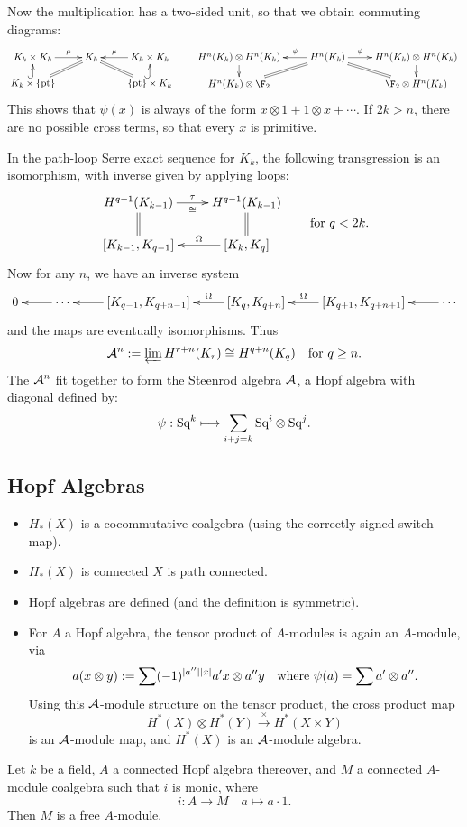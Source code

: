 \documentclass[11pt]{article}
\renewcommand{\Steen}{\calA}
\begin{document}
\noindent Now the multiplication has a two-sided unit, so that we obtain commuting diagrams:
\[\xymatrix@R=.4cm{
K_k\times K_k
\ar[r]^-{\mu}
&%
K_k
\ar@{=}[rd]
\ar@{=}[ld]
&%
K_k\times K_k
\ar[l]_-{\mu}
\\%
K_k\times\{\textup{pt}\}\ar@{^{(}->}[u]
&%
&%
\{\textup{pt}\}\times K_k\ar@{^{(}->}[u]
}\qquad 
\xymatrix@R=.4cm{
H^n(K_k)\otimes H^n(K_k)
\ar[r];[]_-{\psi}
&%
H^n(K_k)
\ar@{=}[dr];[]\ar@{=}[dl];[]
&%
H^n(K_k)\otimes H^n(K_k)
\ar[l];[]^-{\psi}
\\%
H^n(K_k)\otimes\F_2\ar[u];[]
&%
&%
\F_2\otimes H^n(K_k)\ar[u];[]
}\]
This shows that $\psi(x)$ is always of the form $x\otimes 1+1\otimes x+\cdots$. If $2k>n$, there are no possible cross terms, so that every $x$ is primitive.

In the path-loop Serre exact sequence for $K_k$, the following transgression is an isomorphism, with inverse given by applying loops:
\[\vcenter{\xymatrix@R=6mm{
{H}^{q-1}(K_{k-1})
\ar[r]_-{\cong}^-{\tau}
\ar@{=}[d]
&%
{H}^{q-1}(K_{k-1})
\ar@{=}[d]
\\%
[K_{k-1},K_{q-1}]
&%
[K_{k},K_{q}]
\ar[l]_-{\Omega}
}}\textup{\qquad for $q<2k$}.\]
Now for any $n$, we have an inverse system
\[\xymatrix{
0&
\ar[l]\cdots&
[K_{q-1},K_{q+n-1}]\ar[l]&
[K_q,K_{q+n}]\ar[l]_-\Omega&
[K_{q+1},K_{q+n+1}]\ar[l]_-\Omega&
\cdots\ar[l]}\]
and the maps are eventually isomorphisms. Thus
\[\Steen^n:=\varprojlim H^{r+n}(K_r)\cong H^{q+n}(K_q)\textup{\quad for $q\geq n$.}\]
The $\Steen^n$ fit together to form the Steenrod algebra $\Steen$, a Hopf algebra with diagonal defined by:
\[\psi:\textup{Sq}^k\longmapsto\sum_{i+j=k}\textup{Sq}^i\otimes\textup{Sq}^j.\]
\subsection{Hopf Algebras}
\begin{itemize}\squishlist
\item $H_*(X)$ is a cocommutative coalgebra (using the correctly signed switch map).
\item $H_*(X)$ is connected \Iff $X$ is path connected.
\item Hopf algebras are defined (and the definition is symmetric).
\item For $A$ a Hopf algebra, the tensor product of $A$-modules is again an $A$-module, via
\[a(x\otimes y):=\sum(-1)^{|a''||x|}a'x\otimes a''y\textup{\quad where $\psi(a)=\sum a'\otimes a''$.}\]
Using this $\Steen$-module structure on the tensor product, the cross product map
\[H^*(X)\otimes H^*(Y)\overset{\times }{\to}H^*(X\times Y)\]
is an $\Steen$-module map, and $H^*(X)$ is an $\Steen$-module algebra.
\end{itemize}
\begin{prop*}
Let $k$ be a field, $A$ a connected Hopf algebra thereover, and $M$ a connected $A$-module coalgebra such that $i$ is monic, where
\[i:A\to M\quad a\mapsto a\cdot 1.\]
 Then $M$ is a free $A$-module.
\end{prop*}
\end{document}
